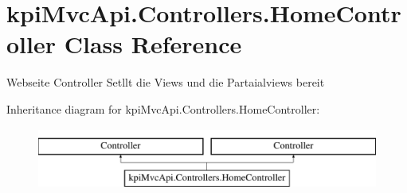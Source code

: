 \hypertarget{classkpi_mvc_api_1_1_controllers_1_1_home_controller}{}\section{kpi\+Mvc\+Api.\+Controllers.\+Home\+Controller Class Reference}
\label{classkpi_mvc_api_1_1_controllers_1_1_home_controller}


Webseite Controller Setllt die Views und die Partaialviews bereit  


Inheritance diagram for kpi\+Mvc\+Api.\+Controllers.\+Home\+Controller\+:\begin{figure}[H]
\begin{center}
\leavevmode
\includegraphics[height=2.000000cm]{classkpi_mvc_api_1_1_controllers_1_1_home_controller}
\end{center}
\end{figure}
